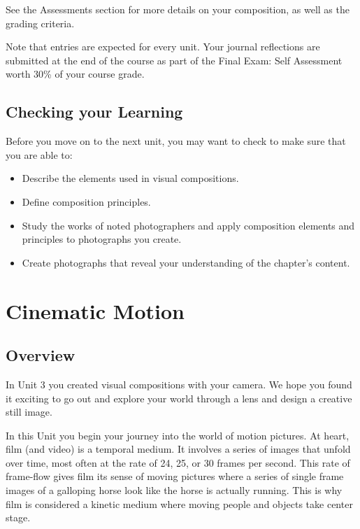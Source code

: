\documentclass[
]{book}
\providecommand{\tightlist}{%
  \setlength{\itemsep}{0pt}\setlength{\parskip}{0pt}}
\begin{document}
See the Assessments section for more details on your composition, as well as the grading criteria.

Note that entries are expected for every unit. Your journal reflections are submitted at the end of the course as part of the Final Exam: Self Assessment worth 30\% of your course grade.

\hypertarget{checking-your-learning-2}{%
\section*{Checking your Learning}\label{checking-your-learning-2}}

\begin{progress}
Before you move on to the next unit, you may want to check to make sure that you are able to:

\begin{itemize}
\tightlist
\item
  Describe the elements used in visual compositions.
\item
  Define composition principles.
\item
  Study the works of noted photographers and apply composition elements and principles to photographs you create.
\item
  Create photographs that reveal your understanding of the chapter's content.
\end{itemize}
\end{progress}

\hypertarget{cinematic-motion}{%
\chapter{Cinematic Motion}\label{cinematic-motion}}

\hypertarget{overview-3}{%
\section*{Overview}\label{overview-3}}

In Unit 3 you created visual compositions with your camera. We hope you found it exciting to go out and explore your world through a lens and design a creative still image.

In this Unit you begin your journey into the world of motion pictures. At heart, film (and video) is a temporal medium. It involves a series of images that unfold over time, most often at the rate of 24, 25, or 30 frames per second. This rate of frame-flow gives film its sense of moving pictures where a series of single frame images of a galloping horse look like the horse is actually running. This is why film is considered a kinetic medium where moving people and objects take center stage.
\end{document}
